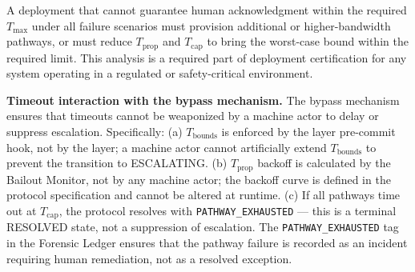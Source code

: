 A deployment that cannot guarantee human acknowledgment within the required $T_{\max}$ under all failure scenarios must provision additional or higher-bandwidth pathways, or must reduce $T_{\text{prop}}$ and $T_{\text{cap}}$ to bring the worst-case bound within the required limit. This analysis is a required part of deployment certification for any \bxthree{} system operating in a regulated or safety-critical environment.

\bigskip
\noindent\textbf{Timeout interaction with the bypass mechanism.} The bypass mechanism ensures that timeouts cannot be weaponized by a machine actor to delay or suppress escalation. Specifically: (a) $T_{\text{bounds}}$ is enforced by the \fact{} layer pre-commit hook, not by the \bounds{} layer; a machine actor cannot artificially extend $T_{\text{bounds}}$ to prevent the transition to ESCALATING. (b) $T_{\text{prop}}$ backoff is calculated by the Bailout Monitor, not by any machine actor; the backoff curve is defined in the protocol specification and cannot be altered at runtime. (c) If all pathways time out at $T_{\text{cap}}$, the protocol resolves with \texttt{PATHWAY\_EXHAUSTED} --- this is a terminal RESOLVED state, not a suppression of escalation. The \texttt{PATHWAY\_EXHAUSTED} tag in the Forensic Ledger ensures that the pathway failure is recorded as an incident requiring human remediation, not as a resolved exception.
